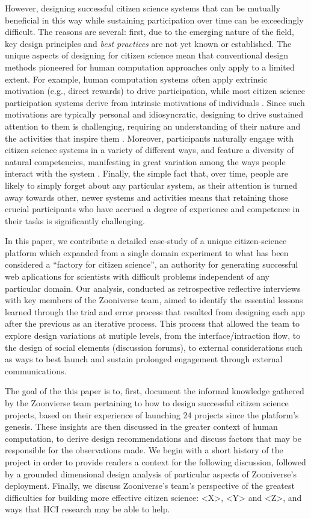 \documentclass{sigchi}
\begin{document}
However, designing successful citizen science systems that can be
mutually beneficial in this way while sustaining participation over
time can be exceedingly difficult.  The reasons are several: first,
due to the emerging nature of the field, key design principles and
\emph{best practices} are not yet known or established.  The unique
aspects of designing for citizen science mean that conventional design
methods pioneered for human computation approaches only apply to a
limited extent.  For example, human computation systems often apply
extrinsic motivation (e.g., direct rewards) to drive participation,
while most citizen science participation systems derive from intrinsic
motivations of individuals \cite{extrinsic-vs-intrinsic}.  Since such
motivations are typically personal and idiosyncratic, designing to
drive sustained attention to them is challenging, requiring an
understanding of their nature and the activities that inspire them
\cite{}.  Moreover, participants naturally engage with citizen science
systems in a variety of different ways, and feature a diversity of
natural competencies, manifesting in great variation among the ways
people interact with the system \cite{raddick}. Finally, the simple
fact that, over time, people are likely to simply forget about any
particular system, as their attention is turned away towards other,
newer systems and activities means that retaining those crucial
participants who have accrued a degree of experience and competence in
their tasks is significantly challenging.

In this paper, we contribute a detailed case-study of a unique
citizen-science platform which expanded from a single domain
experiment to what has been considered a ``factory for citizen
science'', an authority for generating successful web aplications for scientists
with difficult problems independent of any particular domain.
Our analysis, conducted as retrospective reflective interviews with key
members of the Zooniverse team, aimed to identify the essential
lessons learned through the trial and error process that resulted from
designing each app after the previous as an iterative process.  This
process that allowed the team to explore design variations at mutiple levels, from the interface/intraction flow, to the design of social elements (discussion forums), to external considerations such as ways to best launch and sustain prolonged engagement through external communications.

The goal of the this paper is to, first, document the informal
knowledge gathered by the Zoonvierse team pertaining to how to design
successful citizen science projects, based on their experience of
launching 24 projects since the platform's genesis.  These insights
are then discussed in the greater context of human computation, to
derive design recommendations and discuss factors that may be
responsible for the observations made. We begin with a short history
of the project in order to provide readers a context for the following
discussion, followed by a grounded dimensional design analysis of
particular aspects of Zooniverse's deployment.  Finally, we discuss 
Zooniverse's team's perspective of the greatest difficulties for
building more effective citizen science: <X>, <Y> and <Z>, and
ways that HCI research may be able to help.
\end{document}
